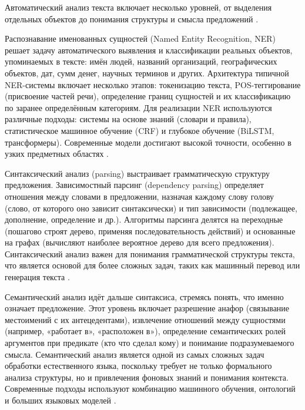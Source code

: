 \documentclass{SibFU-docs}
\begin{document}

Автоматический анализ текста включает несколько уровней, от выделения отдельных объектов до понимания структуры и смысла предложений \cite{GeeksforGeeks2024NER, SparkNLP2022DepParsing}.

Распознавание именованных сущностей (Named Entity Recognition, NER) решает задачу автоматического выявления и классификации реальных объектов, упоминаемых в тексте: имён людей, названий организаций, географических объектов, дат, сумм денег, научных терминов и других. Архитектура типичной NER-системы включает несколько этапов: токенизацию текста, POS-теггирование (присвоение частей речи), определение границ сущностей и их классификацию по заранее определённым категориям. Для реализации NER используются различные подходы: системы на основе знаний (словари и правила), статистическое машинное обучение (CRF) и глубокое обучение (BiLSTM, трансформеры). Современные модели достигают высокой точности, особенно в узких предметных областях \cite{Kairntech2025NER, arXiv2011NER}.

Синтаксический анализ (parsing) выстраивает грамматическую структуру предложения. Зависимостный парсинг (dependency parsing) определяет отношения между словами в предложении, назначая каждому слову голову (слово, от которого оно зависит синтаксически) и тип зависимости (подлежащее, дополнение, определение и др.). Алгоритмы парсинга делятся на переходные (пошагово строят дерево, применяя последовательность действий) и основанные на графах (вычисляют наиболее вероятное дерево для всего предложения). Синтаксический анализ важен для понимания грамматической структуры текста, что является основой для более сложных задач, таких как машинный перевод или генерация текста \cite{SparkNLP2022DepParsing}.

Семантический анализ идёт дальше синтаксиса, стремясь понять, что именно означает предложение. Этот уровень включает разрешение анафор (связывание местоимений с их антецедентами), извлечение отношений между сущностями (например, «работает в», «расположен в»), определение семантических ролей аргументов при предикате (кто что сделал кому) и понимание подразумеваемого смысла. Семантический анализ является одной из самых сложных задач обработки естественного языка, поскольку требует не только формального анализа структуры, но и привлечения фоновых знаний и понимания контекста. Современные подходы используют комбинацию машинного обучения, онтологий и больших языковых моделей \cite{ParallelDots2018NLP}.
\end{document}
